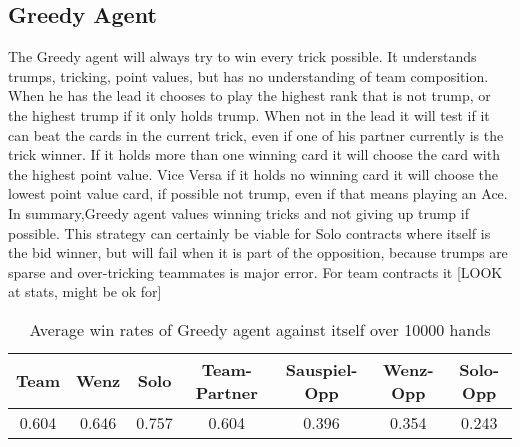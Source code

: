 \subsection{Greedy Agent}
The Greedy agent will always try to win every trick possible.
It understands trumps, tricking, point values, but has no understanding of team composition.
When he has the lead it chooses to play the highest rank that is not trump, or the highest trump if it only holds trump.
When not in the lead it will test if it can beat the cards in the current trick, even if one of his partner currently
is the trick winner.
If it holds more than one winning card it will choose the card with the highest point value.
Vice Versa if it holds no winning card it will choose the lowest point value card, if possible not trump, even if
that means playing an Ace.\\
In summary,Greedy agent values winning tricks and not giving up trump if possible.
This strategy can certainly be viable for Solo contracts where itself is the bid winner, but will fail when it is
part of the opposition, because trumps are sparse and over-tricking teammates is major error.
For team contracts it [LOOK at stats, might be ok for]
\begin{table}[!h]
    \centering
    \begin{tabular}{ccccccc}
        \toprule
        Team  & Wenz  & Solo  & Team-Partner & Sauspiel-Opp & Wenz-Opp & Solo-Opp \\
        \midrule
        0.604 & 0.646 & 0.757 & 0.604        & 0.396        & 0.354    & 0.243    \\
        \bottomrule
    \end{tabular}
    \caption{Average win rates of Greedy agent against itself over 10000 hands}
    \label{tab:winratesGre}
\end{table}

